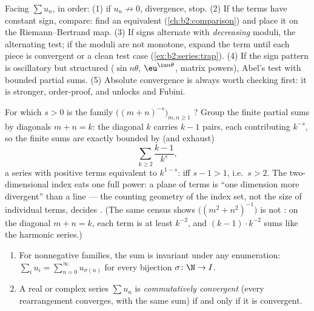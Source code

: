 \begin{method}\label{met:b2:series:choosing}
Facing $\sum u_n$, in order: (1) if $u_n \not\to 0$, divergence,
stop. (2) If the terms have constant sign, compare: find an
equivalent (\cref{ch:b2:comparison}) and place it on the
Riemann--Bertrand map. (3) If signs alternate with
\emph{decreasing} moduli, the alternating test; if the moduli
are not monotone, expand the term until each piece is 
convergent or a clean test case (\cref{ex:b2:series:trap}). (4)
If the sign pattern is oscillatory but structured ($\sin
n\theta$, $\eu^{\iu n\theta}$, matrix powers), Abel's test with
bounded partial sums. (5) Absolute convergence is always worth
checking first: it is stronger, order-proof, and unlocks  and Fubini.
\end{method}

\begin{example}\label{ex:b2:series:diagonalcount}
For which $s > 0$ is the family
$\bigl((m + n)^{-s}\bigr)_{m, n \geq 1}$ ? Group the
finite partial sums by diagonals $m + n = k$: the diagonal $k$
carries $k - 1$ pairs, each contributing $k^{-s}$, so the
finite sums are exactly bounded by (and exhaust)
\[
\sum_{k \geq 2} \frac{k - 1}{k^{s}} ,
\]
a series with positive terms equivalent to $k^{1-s}$: 
iff $s - 1 > 1$, i.e.\ $s > 2$. The two-dimensional index eats
one full power: a plane of terms is ``one dimension more
divergent'' than a line --- the counting geometry of the index
set, not the size of individual terms, decides .
(The same census shows $\bigl((m^2 + n^2)^{-1}\bigr)$ is not
: on the diagonal $m + n = k$, each term is at least
$k^{-2}$, and $(k-1)\cdot k^{-2}$ sums like the harmonic
series.)
\end{example}

\begin{theorem}\label{thm:b2:series:rearrangement}
\begin{enumerate}
  \item For nonnegative families, the sum is invariant under any
        enumeration: $\sum_{i} u_i = \sum_{n=0}^{\infty}
        u_{\sigma(n)}$ for every bijection $\sigma \colon \N \to I$.
  \item A real or complex series $\sum u_n$ is \emph{commutatively
        convergent} (every rearrangement converges, with the same
        sum) if and only if it is  convergent.
\end{enumerate}
\end{theorem}

